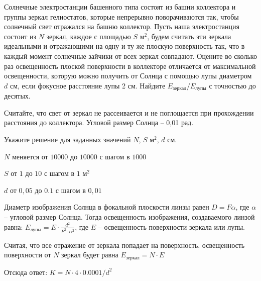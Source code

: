 Солнечные электростанции башенного типа состоят из башни
коллектора и группы зеркал гелиостатов, которые непрерывно поворачиваются так,
чтобы солнечный свет отражался на башню коллектор. Пусть наша электростанция
состоит из $N$ зеркал, каждое с площадью $S$ м$^2$, будем считать эти зеркала идеальными и отражающими
на одну и ту же плоскую поверхность так, что в каждый момент солнечные зайчики
от всех зеркал совпадают. Оцените во сколько раз освещенность плоской
поверхности в коллекторе отличается от максимальной освещенности, которую можно
получить от Солнца с помощью лупы диаметром $d$ см, если фокусное расстояние лупы 2 см. Найдите $E_{\text{зеркал}}/E_{\text{лупы}}$ с точностью
до десятых.

Считайте, что
свет от зеркал не рассеивается и не поглощается при прохождении расстояния до
коллектора. Угловой размер Солнца – 0,01 рад.

Укажите решение для заданных значений $N$, $S$ м$^2$, $d$ см.

\paramSection

$N$ меняется от $10000$ до $10000$ с шагом в $1000$

$S$ от $1$ до $10$ с шагом в $1$ м$^2$

$d$ от $0,05$ до $0.1$ с шагом в $0,01$

\solutionSection

Диаметр изображения Солнца в фокальной плоскости линзы равен 
$D = F \alpha$, где  $\alpha$ – угловой размер Солнца. Тогда освещенность изображения, 
создаваемого линзой равна: $E_{\text{лупы}} = E \cdot \frac{d^2}{F^2 \cdot \alpha^2}$, где $E$ – освещенность 
поверхности зеркала или лупы.

Считая, что все отражение от зеркала попадает на поверхность, освещенность поверхности от $N$ зеркал будет 
равна $E_{\text{зеркал}} = N \cdot E$

Отсюда ответ:
		$K = N \cdot 4 \cdot 0.0001/d^2$


